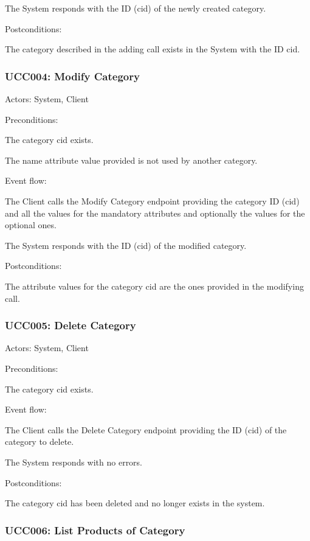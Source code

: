 \ucitem The System responds with the ID (cid) of the newly created category.

Postconditions:

\ucitem The category described in the adding call exists in the System with the ID cid.

\subsubsection{UCC004: Modify Category}
\label{UCC004}

Actors: System, Client

Preconditions:

\ucitem The category cid exists.

\ucitem The name attribute value provided is not used by another category.

Event flow:

\ucitem The Client calls the Modify Category endpoint providing the category ID (cid) and all the values for the mandatory attributes and optionally the values for the optional ones.

\ucitem The System responds with the ID (cid) of the modified category.

Postconditions:

\ucitem The attribute values for the category cid are the ones provided in the modifying call.

\subsubsection{UCC005: Delete Category}
\label{UCC005}

Actors: System, Client

Preconditions:

\ucitem The category cid exists.

Event flow:

\ucitem The Client calls the Delete Category endpoint providing the ID (cid) of the category to delete.

\ucitem The System responds with no errors.

Postconditions:

\ucitem The category cid has been deleted and no longer exists in the system.

\subsubsection{UCC006: List Products of Category}
\label{UCC006}

